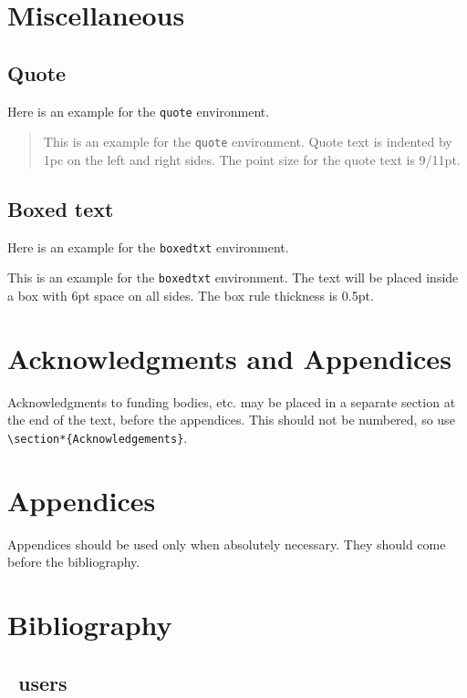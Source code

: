 \section{Miscellaneous}
\subsection{Quote}
Here is an example for the \verb|quote| environment.

\begin{quote}
This is an example for the \verb|quote| environment. Quote text is
indented by 1pc on the left and right sides. The point size for the
quote text is 9/11pt.
\end{quote}

\subsection{Boxed text}
Here is an example for the \verb|boxedtxt| environment.

\begin{boxedtxt}
This is an example for the \verb|boxedtxt| environment. The text will be
placed inside a box with 6pt space on all sides. The box rule
thickness is 0.5pt.
\end{boxedtxt}

\section{Acknowledgments and Appendices}
Acknowledgments to funding bodies, etc. may be placed in a separate
section at the end of the text, before the appendices. This should not
be numbered, so use \verb|\section*{Acknowledgements}|.

\section{Appendices}
Appendices should be used only when absolutely necessary. They
should come before the bibliography.

\section{Bibliography}

\subsection{\btex\ users}

